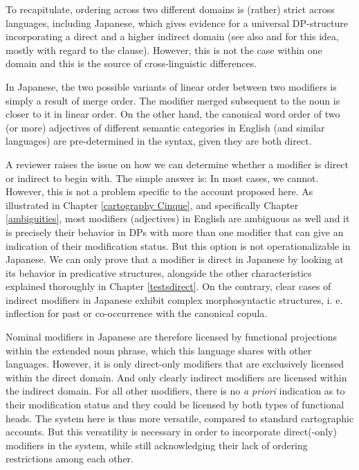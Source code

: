 \documentclass [output=book,colorlinks,citecolor=brown]{langscibook}
\begin{document}
To recapitulate, ordering across two different domains is (rather) strict across languages, including Japanese, which gives evidence for a universal DP-structure incorporating a direct and a higher indirect domain (see also \citealt{ramchand:2014:deriving} and \citealt{wurmbrand:2023:ich} for this idea, mostly with regard to the clause). However, this is not the case within one domain and this is the source of cross-linguistic differences.

In Japanese, the two possible variants of linear order between two modifiers is simply a result of merge order. The modifier merged subsequent to the noun is closer to it in linear order. On the other hand, the canonical word order of two (or more) adjectives of different semantic categories in English (and similar languages) are pre-determined in the syntax, given they are both direct.

A reviewer raises the issue on how we can determine whether a modifier is direct or indirect to begin with. The simple answer is: In most cases, we cannot. However, this is not a problem specific to the account proposed here. As illustrated in Chapter \ref{cartography Cinque}, and specifically Chapter \ref{ambiguities}, most modifiers (adjectives) in English are ambiguous as well and it is precisely their behavior in DPs with more than one modifier that can give an indication of their modification status. But this option is not operationalizable in Japanese. We can only prove that a modifier is direct in Japanese by looking at its behavior in predicative structures, alongside the other characteristics explained thoroughly in Chapter \ref{testsdirect}. On the contrary, clear cases of indirect modifiers in Japanese exhibit complex morphosyntactic structures, i. e. inflection for past or co-occurrence with the canonical copula.

Nominal modifiers in Japanese are therefore licensed by functional projections within the extended noun phrase, which this language shares with other languages. However, it is only direct-only modifiers that are exclusively licensed within the direct domain. And only clearly indirect modifiers are licensed within the indirect domain. For all other modifiers, there is no \textit{a priori} indication as to their modification status and they could be licensed by both types of functional heads. The system here is thus more versatile, compared to standard cartographic accounts. But this versatility is necessary in order to incorporate direct(-only) modifiers in the system, while still acknowledging their lack of ordering restrictions among each other.
\end{document}
